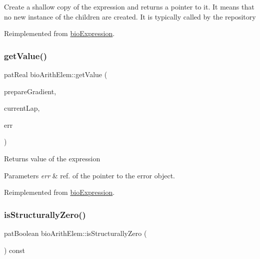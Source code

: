 Create a shallow copy of the expression and returns a pointer to it. It means that no new instance of the children are created. It is typically called by the repository 

Reimplemented from \hyperlink{classbio_expression_a442534762693b92baaf33928979a1bf8}{bio\+Expression}.

\mbox{\label{classbio_arith_elem_aac719574ab496e1b3341b9e4b71a7986}} 
\subsubsection{\texorpdfstring{get\+Value()}{getValue()}}
{\footnotesize\ttfamily pat\+Real bio\+Arith\+Elem\+::get\+Value (\begin{DoxyParamCaption}\item[{pat\+Boolean}]{prepare\+Gradient,  }\item[{pat\+U\+Long}]{current\+Lap,  }\item[{pat\+Error $\ast$\&}]{err }\end{DoxyParamCaption})\hspace{0.3cm}{\ttfamily [virtual]}}

\begin{DoxyReturn}{Returns}
value of the expression 
\end{DoxyReturn}

\begin{DoxyParams}{Parameters}
{\em err} & ref. of the pointer to the error object. \\
\hline
\end{DoxyParams}


Reimplemented from \hyperlink{classbio_expression_af58662a5d4d456f15bc4f2c9bd4f8a5b}{bio\+Expression}.

\mbox{\label{classbio_arith_elem_a9d64d5197cb2cab10396c3e9d8add42b}} 
\subsubsection{\texorpdfstring{is\+Structurally\+Zero()}{isStructurallyZero()}}
{\footnotesize\ttfamily pat\+Boolean bio\+Arith\+Elem\+::is\+Structurally\+Zero (\begin{DoxyParamCaption}{ }\end{DoxyParamCaption}) const\hspace{0.3cm}{\ttfamily [virtual]}}

